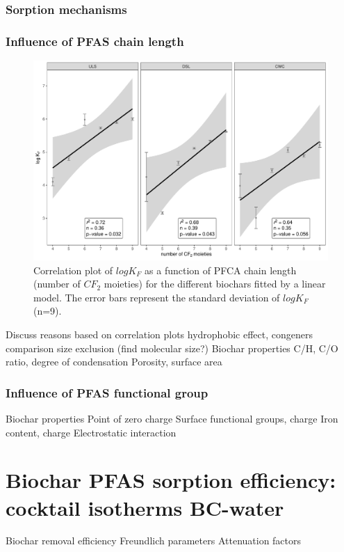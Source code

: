 \subsubsection{Sorption mechanisms}

\subsubsection{Influence of PFAS chain length}

\begin{figure}
    \centering
    \includegraphics[width=\textwidth]{R/figs/chainlength_KF.pdf}
    \caption{Correlation plot of $log K_F$ as a function of PFCA chain length (number of $CF_2$ moieties) for the different biochars fitted by a linear model. The error bars represent the standard deviation of $log K_F$ (n=9).}
    \label{fig:chainlength}
\end{figure}
 
Discuss reasons based on correlation plots
    hydrophobic effect, congeners comparison
    size exclusion (find molecular size?)
    Biochar properties
        C/H, C/O ratio, degree of condensation
        Porosity, surface area

\subsubsection{Influence of PFAS functional group}
Biochar properties
    Point of zero charge
    Surface functional groups, charge
    Iron content, charge
    Electrostatic interaction

\section{Biochar PFAS sorption efficiency: cocktail isotherms BC-water}
Biochar removal efficiency 
Freundlich parameters
Attenuation factors


